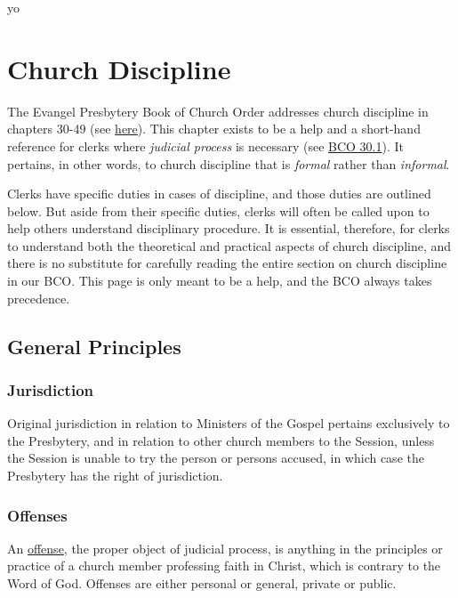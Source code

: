 \documentclass[
]{book}
\begin{document}
yo

\hypertarget{church-discipline}{%
\chapter{Church Discipline}\label{church-discipline}}

The Evangel Presbytery Book of Church Order addresses church discipline in chapters 30-49 (see \href{https://evangel.pressbooks.com/chapter/30-discipline-its-nature-subjects-and-ends/}{here}). This chapter exists to be a help and a short-hand reference for clerks where \emph{judicial process} is necessary (see \href{https://evangel.pressbooks.com/chapter/30-discipline-its-nature-subjects-and-ends/}{BCO 30.1}). It pertains, in other words, to church discipline that is \emph{formal} rather than \emph{informal}.

Clerks have specific duties in cases of discipline, and those duties are outlined below. But aside from their specific duties, clerks will often be called upon to help others understand disciplinary procedure. It is essential, therefore, for clerks to understand both the theoretical and practical aspects of church discipline, and there is no substitute for carefully reading the entire section on church discipline in our BCO. This page is only meant to be a help, and the BCO always takes precedence.

\hypertarget{general-principles}{%
\section{General Principles}\label{general-principles}}

\hypertarget{jurisdiction}{%
\subsection{Jurisdiction}\label{jurisdiction}}

Original jurisdiction in relation to Ministers of the Gospel pertains exclusively to the Presbytery, and in relation to other church members to the Session, unless the Session is unable to try the person or persons accused, in which case the Presbytery has the right of jurisdiction.

\hypertarget{offenses}{%
\subsection{Offenses}\label{offenses}}

An \href{https://evangel.pressbooks.com/chapter/32-offenses/}{offense}, the proper object of judicial process, is anything in the principles or practice of a church member professing faith in Christ, which is contrary to the Word of God. Offenses are either personal or general, private or public.
\end{document}
